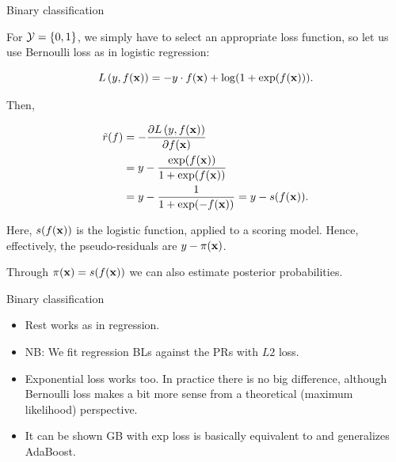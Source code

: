 \documentclass[11pt,compress,t,notes=noshow, xcolor=table]{beamer}
\begin{document}

\begin{framev}{Binary classification}


For $\mathcal{Y} = \{0, 1\}$, we simply have to select an appropriate loss function, so let us
use Bernoulli loss as in logistic regression:

$$ L\left(y, f(\mathbf{x})\right) = - y \cdot f(\mathbf{x}) + \log(1 + \exp(f(\mathbf{x}))).$$

Then,

\vspace{-0.5cm}

\begin{align*}
\tilde{r}(f) &=-\frac{\partial{L\left(y, f(\mathbf{x})\right)}}{\partial f(\mathbf{x})} \\
&= y - \frac{\exp(f(\mathbf{x}))}{1 + \exp(f(\mathbf{x}))} \\
&= y - \frac{1}{1 + \exp(-f(\mathbf{x}))} = y - s(f(\mathbf{x})).
\end{align*}

Here, $s(f(\mathbf{x}))$ is the logistic function, applied to a scoring model.
Hence, effectively, the pseudo-residuals are $y - \pi(\mathbf{x})$.

Through $\pi(\mathbf{x}) = s(f(\mathbf{x}))$ we can also estimate posterior probabilities.

\end{framev}
\begin{framev}{Binary classification}
%

\begin{itemize}
\item Rest works as in regression.
\item NB: We fit regression BLs against the PRs with $L2$ loss. 
\item  Exponential loss works too. 
    In practice there is no big difference, although Bernoulli loss 
    makes a bit more sense from a theoretical (maximum likelihood) perspective.
\item It can be shown GB with exp loss is basically equivalent to and generalizes AdaBoost. 
\end{itemize}


\end{framev}
\end{document}
